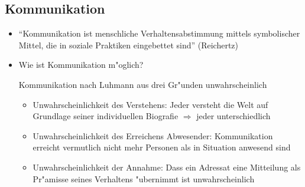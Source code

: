 \documentclass[a4paper, 12pt]{scrartcl}
\begin{document}
\subsection{Kommunikation}
\begin{itemize}
	\item
		\enquote{Kommunikation ist menschliche Verhaltensabstimmung mittels symbolischer Mittel, die in soziale Praktiken eingebettet sind} (Reichertz)
	\item
		Wie ist Kommunikation m"oglich?

		Kommunikation nach Luhmann aus drei Gr"unden unwahrscheinlich
		\begin{itemize}
			\item
				Unwahrscheinlichkeit des Verstehens: Jeder versteht die Welt auf Grundlage seiner individuellen Biografie $\Rightarrow$ jeder unterschiedlich
			\item
				Unwahrscheinlichkeit des Erreichens Abwesender: Kommunikation erreicht vermutlich nicht mehr Personen als in Situation anwesend sind
			\item
				Unwahrscheinlichkeit der Annahme: Dass ein Adressat eine Mitteilung als Pr"amisse seines Verhaltens "ubernimmt ist unwahrscheinlich
		\end{itemize}
\end{itemize}
\end{document}
